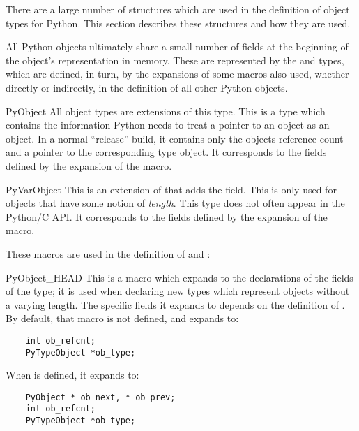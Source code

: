 There are a large number of structures which are used in the
definition of object types for Python.  This section describes these
structures and how they are used.

All Python objects ultimately share a small number of fields at the
beginning of the object's representation in memory.  These are
represented by the  and  types,
which are defined, in turn, by the expansions of some macros also
used, whether directly or indirectly, in the definition of all other
Python objects.

\begin{ctypedesc}{PyObject}
  All object types are extensions of this type.  This is a type which
  contains the information Python needs to treat a pointer to an
  object as an object.  In a normal ``release'' build, it contains
  only the objects reference count and a pointer to the corresponding
  type object.  It corresponds to the fields defined by the
  expansion of the  macro.
\end{ctypedesc}

\begin{ctypedesc}{PyVarObject}
  This is an extension of  that adds the
   field.  This is only used for objects that have
  some notion of \emph{length}.  This type does not often appear in
  the Python/C API.  It corresponds to the fields defined by the
  expansion of the  macro.
\end{ctypedesc}

These macros are used in the definition of  and
:

\begin{csimplemacrodesc}{PyObject_HEAD}
  This is a macro which expands to the declarations of the fields of
  the  type; it is used when declaring new types which
  represent objects without a varying length.  The specific fields it
  expands to depends on the definition of
  .  By default, that macro is not
  defined, and  expands to:
  \begin{verbatim}
    int ob_refcnt;
    PyTypeObject *ob_type;
  \end{verbatim}
  When  is defined, it expands to:
  \begin{verbatim}
    PyObject *_ob_next, *_ob_prev;
    int ob_refcnt;
    PyTypeObject *ob_type;
  \end{verbatim}
\end{csimplemacrodesc}


